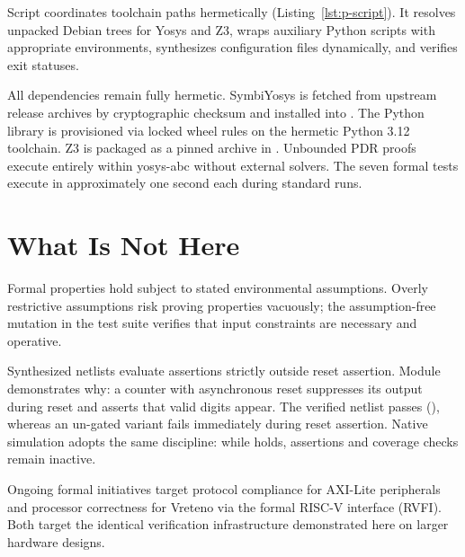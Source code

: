 \documentclass[journal,9pt]{IEEEtran}
\begin{document}


Script  coordinates toolchain paths hermetically
(Listing~\ref{lst:p-script}). It resolves unpacked Debian trees for Yosys and
Z3, wraps auxiliary Python scripts with appropriate 
environments, synthesizes  configuration files dynamically, and
verifies exit statuses.



All dependencies remain fully hermetic. SymbiYosys is fetched from upstream
release archives by cryptographic checksum and installed into
. The Python  library is provisioned via
locked wheel rules on the hermetic Python 3.12 toolchain. Z3 is packaged as a
pinned archive in . Unbounded PDR proofs execute
entirely within yosys-abc without external solvers. The seven formal tests
execute in approximately one second each during standard 
runs.

\section{What Is Not Here}
\label{sec:p-not}

Formal properties hold subject to stated environmental assumptions. Overly
restrictive assumptions risk proving properties vacuously; the assumption-free
mutation in the test suite verifies that input constraints are necessary and
operative.

Synthesized netlists evaluate assertions strictly outside reset assertion.
Module  demonstrates why: a counter with asynchronous reset
suppresses its output during reset and asserts that valid digits appear. The
verified netlist passes (), whereas an
un-gated variant fails immediately during reset assertion. Native simulation
adopts the same discipline: while  holds, assertions and
coverage checks remain inactive.

Ongoing formal initiatives target protocol compliance for AXI-Lite peripherals
and processor correctness for Vreteno via the formal RISC-V interface (RVFI).
Both target the identical verification infrastructure demonstrated here on
larger hardware designs.
\end{document}
